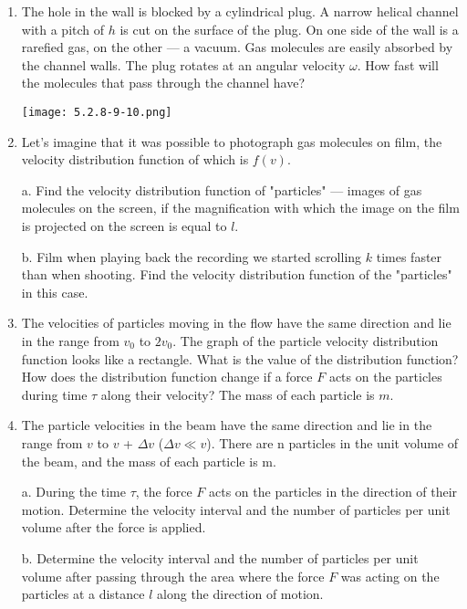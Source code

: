 \documentclass{article}
\begin{document}
\begin{enumerate}[label=5.2.\arabic*]
\item The hole in the wall is blocked by a cylindrical plug. A narrow helical channel with a pitch of $h$ is cut on the surface of the plug. On one side of the wall is a rarefied gas, on the other — a vacuum. Gas molecules are easily absorbed by the channel walls. The plug rotates at an angular velocity $\omega$. How fast will the molecules that pass through the channel have?

\begin{center}
    \texttt{[image: 5.2.8-9-10.png]}
\end{center}


\item Let's imagine that it was possible to photograph gas molecules on film, the velocity distribution function of which is $f(v)$. 

a. Find the velocity distribution function of "particles" — images of gas molecules on the screen, if the magnification with which the image on the film is projected on the screen is equal to $l$. 

b. Film when playing back the recording we started scrolling $k$ times faster than when shooting. Find the velocity distribution function of the "particles" in this case.

\item The velocities of particles moving in the flow have the same direction and lie in the range from $v_0$ to $2v_0$. The graph of the particle velocity distribution function looks like a rectangle. What is the value of the distribution function? How does the distribution function change if a force $F$ acts on the particles during time $\tau$ along their velocity? The mass of each particle is $m$.

\item The particle velocities in the beam have the same direction and lie in the range from $v$ to $v$ + $\Delta v$ ($\Delta v \ll v$). There are n particles in the unit volume of the beam, and the mass of each particle is m. 

a. During the time $\tau$, the force $F$ acts on the particles in the direction of their motion. Determine the velocity interval and the number of particles per unit volume after the force is applied. 

b. Determine the velocity interval and the number of particles per unit volume after passing through the area where the force $F$ was acting on the particles at a distance $l$ along the direction of motion.


\end{enumerate}
\end{document}
